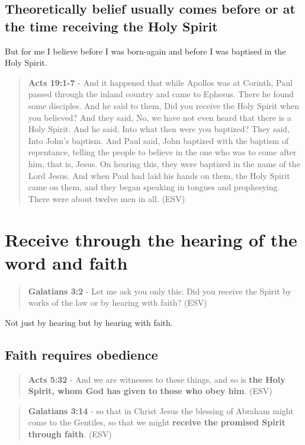 \documentclass[11pt]{article}
\begin{document}
\subsection{Theoretically belief usually comes before or at the time receiving the Holy Spirit}
\label{sec:orgf62727a}
But for me I believe before I was born-again and before I was baptised in the Holy Spirit.

\begin{quote}
\textbf{Acts 19:1-7} - And it happened that while Apollos was at Corinth, Paul passed through the inland country and came to Ephesus. There he found some disciples. And he said to them, Did you receive the Holy Spirit when you believed? And they said, No, we have not even heard that there is a Holy Spirit. And he said, Into what then were you baptized? They said, Into John's baptism. And Paul said, John baptized with the baptism of repentance, telling the people to believe in the one who was to come after him, that is, Jesus. On hearing this, they were baptized in the name of the Lord Jesus. And when Paul had laid his hands on them, the Holy Spirit came on them, and they began speaking in tongues and prophesying. There were about twelve men in all. (ESV)
\end{quote}

\section{Receive through the hearing of the word and faith}
\label{sec:org07d8894}
\begin{quote}
\textbf{Galatians 3:2} - Let me ask you only this: Did you receive the Spirit by works of the law or by hearing with faith? (ESV)
\end{quote}

Not just by hearing but by hearing with faith.

\subsection{Faith requires obedience}
\label{sec:org0c4cd3b}
\begin{quote}
\textbf{Acts 5:32} - And we are witnesses to these things, and so is \textbf{the Holy Spirit, whom God has given to those who obey him}. (ESV)
\end{quote}

\begin{quote}
\textbf{Galatians 3:14} - so that in Christ Jesus the blessing of Abraham might come to the Gentiles, so that we might \textbf{receive the promised Spirit through faith}. (ESV)
\end{quote}
\end{document}

